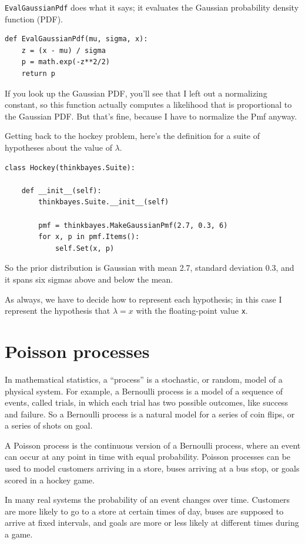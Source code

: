 \documentclass[12pt]{book}
\begin{document}
\verb"EvalGaussianPdf" does what it says; it evaluates the
Gaussian probability density function (PDF).

\begin{verbatim}
def EvalGaussianPdf(mu, sigma, x):
    z = (x - mu) / sigma
    p = math.exp(-z**2/2)
    return p
\end{verbatim}  

If you look up the Gaussian PDF, you'll see that I left out a
normalizing constant, so this function actually computes
a likelihood that is proportional to the Gaussian PDF.  But
that's fine, because I have to normalize the Pmf anyway.

Getting back to the hockey problem, here's the definition for a suite
of hypotheses about the value of $\lambda$.

\begin{verbatim}
class Hockey(thinkbayes.Suite):

    def __init__(self):
        thinkbayes.Suite.__init__(self)

        pmf = thinkbayes.MakeGaussianPmf(2.7, 0.3, 6)
        for x, p in pmf.Items():
            self.Set(x, p)
\end{verbatim}  

So the prior distribution is Gaussian with mean 2.7, standard deviation
0.3, and it spans six sigmas above and below the mean.

As always, we have to decide how to represent each hypothesis; in
this case I represent the hypothesis that $\lambda=x$ with the
floating-point value {\tt x}. 


\section{Poisson processes}

In mathematical statistics, a ``process'' is a stochastic, or random,
model of a physical system.  For example, a Bernoulli process is a model
of a sequence of events, called trials, in which each trial has
two possible outcomes, like success and failure.  So a Bernoulli
process is a natural model for a series of coin flips, or a series
of shots on goal.

A Poisson process is the continuous version of a Bernoulli process,
where an event can occur at any point in time with equal probability.
Poisson processes can be used to model customers arriving in a store,
buses arriving at a bus stop, or goals scored in a hockey game.

In many real systems the probability of an event changes over time.
Customers are more likely to go to a store at certain times of day,
buses are supposed to arrive at fixed intervals, and goals are more
or less likely at different times during a game.
\end{document}
